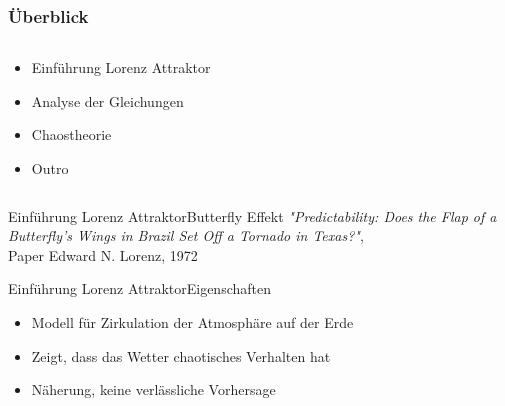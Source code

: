 \documentclass[presentation.tex]{subfiles}
\begin{document}
	\frame{\titlepage}
    
    \begin{frame}
        \frametitle{Überblick}
        \begin{columns}
        	\begin{column}{0.6\linewidth}
        		\begin{itemize}
        			\item Einführung Lorenz Attraktor
        			\item Analyse der Gleichungen
        			\item Chaostheorie
        			\item Outro
        		\end{itemize}
        	\end{column}
        	\begin{column}{0.4\linewidth}
        		\begin{figure}
				\centering
				\label{fig:lorenz-modell}
				\end{figure}
        	\end{column}
        \end{columns}
    \end{frame}
    
    \begin{frame}{Einführung Lorenz Attraktor}{Butterfly Effekt}
		\textit{"Predictability: Does the Flap of a Butterfly's Wings in Brazil Set Off a Tornado in Texas?"}, \\
		Paper Edward N. Lorenz, 1972
    \end{frame}
    
    \begin{frame}{Einführung Lorenz Attraktor}{Eigenschaften}
    	\begin{itemize}
    		\item Modell für Zirkulation der Atmosphäre auf der Erde
    		\item Zeigt, dass das Wetter chaotisches Verhalten hat
    		\item Näherung, keine verlässliche Vorhersage
    	\end{itemize}
    \end{frame}
    
\end{document}
